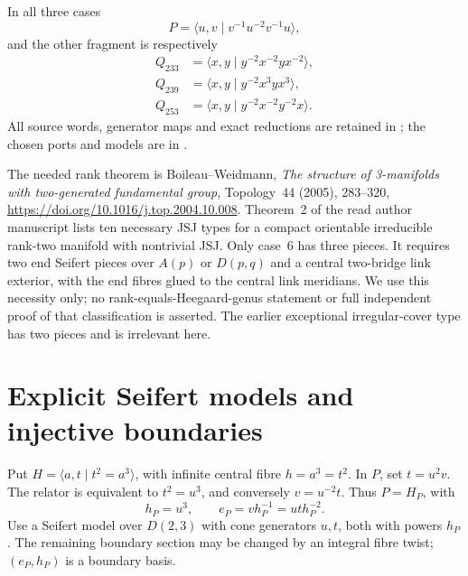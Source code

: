 \documentclass[11pt]{article}
\begin{document}
In all three cases
\[
 P=\langle u,v\mid v^{-1}u^{-2}v^{-1}u\rangle,
\]
and the other fragment is respectively
\begin{align*}
 Q_{233}&=\langle x,y\mid y^{-2}x^{-2}yx^{-2}\rangle,\\
 Q_{239}&=\langle x,y\mid y^{-2}x^3yx^3\rangle,\\
 Q_{253}&=\langle x,y\mid y^{-2}x^{-2}y^{-2}x\rangle.
\end{align*}
All source words, generator maps and exact reductions are retained in
; the chosen ports and
models are in .

The needed rank theorem is Boileau--Weidmann, \emph{The structure of
3-manifolds with two-generated fundamental group}, Topology~44 (2005),
283--320, \url{https://doi.org/10.1016/j.top.2004.10.008}.
Theorem~2 of the read author manuscript lists ten necessary JSJ types for
a compact orientable irreducible rank-two manifold with nontrivial JSJ.
Only case~6 has three pieces. It requires two end Seifert pieces over
$A(p)$ or $D(p,q)$ and a central two-bridge link exterior, with the end
fibres glued to the central link meridians. We use this necessity only;
no rank-equals-Heegaard-genus statement or full independent proof of that
classification is asserted. The earlier exceptional irregular-cover type
has two pieces and is irrelevant here.

\section{Explicit Seifert models and injective boundaries}

Put $H=\langle a,t\mid t^2=a^3\rangle$, with infinite central fibre
$h=a^3=t^2$. In $P$, set $t=u^2v$. The relator is equivalent to
$t^2=u^3$, and conversely $v=u^{-2}t$. Thus $P=H_P$, with
\[
 h_P=u^3,\qquad e_P=v h_P^{-1}=ut h_P^{-2}.
\]
Use a Seifert model over $D(2,3)$ with cone generators $u,t$, both with
powers $h_P$. The remaining boundary section may be changed by an integral
fibre twist; $(e_P,h_P)$ is a boundary basis.
\end{document}
